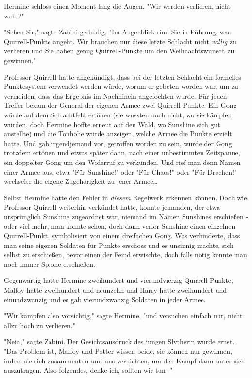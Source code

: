 {Hermine schloss einen Moment lang die Augen. "Wir werden verlieren, nicht wahr?"

"Sehen Sie," sagte Zabini geduldig, "Im Augenblick sind Sie in Führung, was Quirrell-Punkte angeht. Wir brauchen nur diese letzte Schlacht nicht \emph{völlig} zu verlieren und Sie haben genug Quirrell-Punkte um den Weihnachtswunsch zu gewinnen."

Professor Quirrell hatte angekündigt, dass bei der letzten Schlacht ein formelles Punktesystem verwendet werden würde, worum er gebeten worden war, um zu vermeiden, dass das Ergebnis im Nachhinein angefochten wurde. Für jeden Treffer bekam der General der eigenen Armee zwei Quirrell-Punkte. Ein Gong würde auf dem Schlachtfeld ertönen (sie wussten noch nicht, wo sie kämpfen würden, doch Hermine hoffte erneut auf den Wald, wo Sunshine sich gut anstellte) und die Tonhöhe würde anzeigen, welche Armee die Punkte erzielt hatte. Und gab irgendjemand vor, getroffen worden zu sein, würde der Gong trotzdem ertönen und etwas später dann, nach einer unbestimmten Zeitspanne, ein doppelter Gong um den Widerruf zu verkünden. Und rief man denn Namen einer Armee aus, etwa "Für Sunshine!" oder "Für Chaos!" oder "Für Drachen!" wechselte die eigene Zugehörigkeit zu jener Armee…

Selbst Hermine hatte den Fehler in \emph{diesem} Regelwerk erkennen können. Doch wie Professor Quirrell weiterhin verkündet hatte, konnte jemanden, der etwa ursprünglich Sunshine zugeordnet war, niemand im Namen Sunshines erschießen - oder viel mehr, man konnte schon, doch dann verlor Sunshine einen einzelnen Quirrell-Punkt, symbolisiert von einem dreifachen Gong. Was verhinderte, dass man seine eigenen Soldaten für Punkte erschoss und es unsinnig machte, sich selbst zu erschießen, bevor einen der Feind erwischte, doch falls nötig konnte man noch immer Spione erschießen.

Gegenwärtig hatte Hermine zweihundert und vierundvierzig Quirrell-Punkte, Malfoy hatte zweihundert und neunzehn und Harry hatte zweihundert und einundzwanzig und es gab vierundzwanzig Soldaten in jeder Armee.

"Wir kämpfen also vorsichtig," sagte Hermine, "und versuchen einfach nur, nicht allzu hoch zu verlieren."

"Nein," sagte Zabini. Der Gesichtsausdruck des jungen Slytherin wurde ernst. "Das Problem ist, Malfoy und Potter wissen beide, sie können nur gewinnen, indem sie sich zusammentun und uns vernichten, um den Kampf dann unter sich auszutragen. Also folgendes, denke ich, sollten wir tun -"

}
